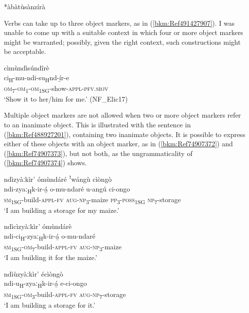 \ex
*àbàtùsànzírà
\z\z

Verbs can take up to three object markers, as in (\ref{bkm:Ref491427907}). I was unable to come up with a suitable context in which four or more object markers might be warranted; possibly, given the right context, such constructions might be acceptable.

\ea
\label{bkm:Ref491427907}
\glll cìmùndìsúndîrè\\
ci\textsubscript{H}-mu-ndi-su\textsubscript{H}nd-í̲r-e\\
\textsc{om}\textsubscript{7}-\textsc{om}\textsubscript{1}-\textsc{om}\textsubscript{1SG}-show-\textsc{appl}-\textsc{pfv}.\textsc{sbjv}\\
\glt ‘Show it to her/him for me.’ (NF\_Elic17)
\z

Multiple object markers are not allowed when two or more object markers refer to an inanimate object. This is illustrated with the sentence in (\ref{bkm:Ref488927201}), containing two inanimate objects. It is possible to express either of these objects with an object marker, as in (\ref{bkm:Ref74907372}) and (\ref{bkm:Ref74907373}), but not both, as the ungrammaticality of (\ref{bkm:Ref74907374}) shows.

\ea
\label{bkm:Ref488927201}
ndìzyàːkìr’ ómùndáré ꜝwángù cìòngò\\
\gll ndi-zyaː\textsubscript{H}k-ir-á̲    o-mu-ndaré    u-angú  ci-ongo\\
\textsc{sm}\textsubscript{1SG}-build-\textsc{appl}-\textsc{fv}  \textsc{aug}-\textsc{np}\textsubscript{3}-maize  \textsc{pp}\textsubscript{3}-\textsc{poss}\textsubscript{1SG}  \textsc{np}\textsubscript{7}-storage\\
\glt ‘I am building a storage for my maize.’
\z

\ea
\label{bkm:Ref74907372}
ndìcìzyàːkìr’ ómùndárè\\
\gll ndi-ci\textsubscript{H}-zyaː\textsubscript{H}k-ir-á̲    o-mu-ndaré\\
\textsc{sm}\textsubscript{1SG}-\textsc{om}\textsubscript{7}-build-\textsc{appl}-\textsc{fv}  \textsc{aug}-\textsc{np}\textsubscript{3}-maize\\
\glt ‘I am building it for the maize.’
\z

\ea
\label{bkm:Ref74907373}
ndìùzyàːkìr’ écìòngò\\
\gll ndi-u\textsubscript{H}-zyaː\textsubscript{H}k-ir-á̲    e-ci-ongo\\
\textsc{sm}\textsubscript{1SG}-\textsc{om}\textsubscript{3}-build-\textsc{appl}-\textsc{fv}  \textsc{aug}-\textsc{np}\textsubscript{7}-storage\\
\glt ‘I am building a storage for it.’
\z

